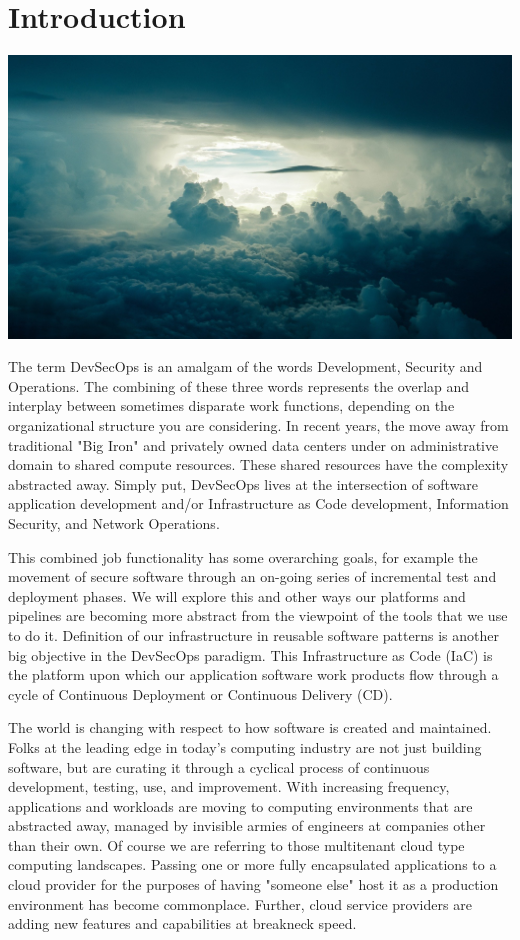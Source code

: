 \chapter{Introduction}

\includegraphics[scale=0.85]{../images/sky-690293_1920.jpg}
\raggedbottom

\justify
The term DevSecOps is an amalgam of the words
Development, Security and Operations. The combining of these three words
represents the overlap and interplay between sometimes disparate work
functions, depending on the organizational structure you are considering.
In recent years, the move away from traditional "Big Iron" and privately owned data
centers under on administrative domain to shared compute resources. These shared
resources have the complexity abstracted away.
Simply put, DevSecOps lives at the intersection of
software application development and/or Infrastructure as Code
development, Information Security, and Network Operations. 

\justify
This combined job functionality has some overarching goals, for example the movement of secure
software through an on-going series of incremental test and deployment
phases. We will explore this and other ways our platforms and pipelines
are becoming more abstract from the viewpoint of the tools that we use to do it.
Definition of our infrastructure in reusable software patterns is another big objective 
in the DevSecOps paradigm. This Infrastructure as Code (IaC)
is the platform
upon which our application software work products flow through a cycle of Continuous 
Deployment or Continuous Delivery (CD). 

\justify
The world is changing with respect to how software is created and maintained. 
Folks at the leading edge in today's computing industry are not just building
software, but are curating it through a cyclical process of continuous development,
testing, use, and improvement. With increasing frequency, applications and
workloads are moving to computing environments that are abstracted away, managed
by invisible armies of engineers at companies other than their own. Of course
we are referring to those multitenant cloud type computing landscapes. Passing
one or more fully encapsulated applications to a cloud provider for the purposes
of having "someone else" host it as a production environment has become
commonplace. Further, cloud service providers are adding new features and capabilities 
at breakneck speed.


